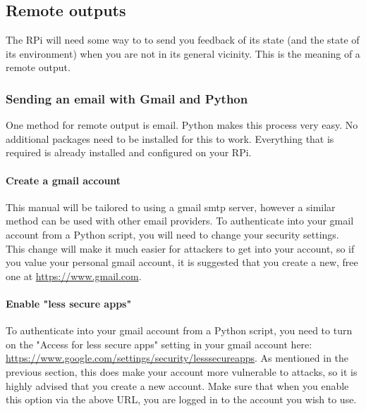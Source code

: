 \documentclass{article}
\begin{document}
\subsection{Remote outputs}
The RPi will need some way to to send you feedback of its state (and the state of its environment) when you are not in its general vicinity. This is the meaning of a remote output.
  \subsubsection{Sending an email with Gmail and Python}
  One method for remote output is email. Python makes this process very easy. No additional packages need to be installed for this to work. Everything that is required is already installed and configured on your RPi.
    \paragraph{Create a gmail account}
    This manual will be tailored to using a gmail smtp server, however a similar method can be used with other email providers. To authenticate into your gmail account from a Python script, you will need to change your security settings. This change will make it much easier for attackers to get into your account, so if you value your personal gmail account, it is suggested that you create a new, free one at \href{https://www.gmail.com}{https://www.gmail.com}.
    \paragraph{Enable "less secure apps"}
    To authenticate into your gmail account from a Python script, you need to turn on the "Access for less secure apps" setting in your gmail account here: \href{https://www.google.com/settings/security/lesssecureapps}{https://www.google.com/settings/security/lesssecureapps}. As mentioned in the previous section, this does make your account more vulnerable to attacks, so it is highly advised that you create a new account. Make sure that when you enable this option via the above URL, you are logged in to the account you wish to use.
\end{document}
